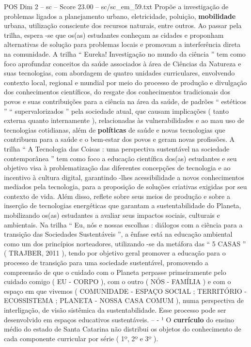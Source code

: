 \begin{textsample}{POS Dim 2 – sc – Score 23.00 – sc/sc\_em\_59.txt}
Propõe a investigação de problemas ligados a planejamento urbano, eletricidade, poluição, \textbf{mobilidade} urbana, utilização consciente dos recursos naturais, entre outros.
Ao passar pela trilha, espera -se que os(as) estudantes conheçam as cidades e proponham alternativas de solução para problemas locais e promovam a interferência direta na comunidade.
A trilha “ Eureka!
Investigação no mundo da ciência ” tem como foco aprofundar conceitos da saúde associados à área de Ciências da Natureza e suas tecnologias, com abordagem de quatro unidades curriculares, envolvendo contexto local, regional e mundial por meio do processo de produção e divulgação dos conhecimentos científicos, do resgate dos conhecimentos tradicionais dos povos e suas contribuições para a ciência na área da saúde, de padrões “ estéticos ” “ supervalorizados ” pela sociedade atual, que causam implicações ( tanto externa quanto internamente ), relacionadas às vulnerabilidades e ao mau uso de tecnologias cotidianas, além de \textbf{políticas} de saúde e novas tecnologias que contribuem para a saúde e o bem-estar dos povos e geram novas profissões.
A trilha “ A Tecnologia das Coisas : uma perspectiva sustentável na sociedade contemporânea ” tem como foco a educação científica dos(as) estudantes e seu objetivo visa à problematização das diferentes concepções de tecnologia e ao incentivo à cultura digital, garantindo -lhes acessibilidade a novos conhecimentos mediados pela tecnologia, para a proposição de soluções criativas exigidas por seu contexto de vida.
Além disso, reflete sobre seus meios de produção e sobre a inserção de tecnologias energéticas que garantam a sustentabilidade do Planeta, mobilizando os(as) estudantes a avaliar seus impactos sociais, culturais e ambientais.
Na trilha “ Eu, nós e nossas escolhas : diálogos com a ciência para a transição das Sociedades Sustentáveis ”, a ênfase está na educação ambiental como um dos princípios norteadores, utilizando -se da metáfora das “ 5 CASAS ” ( TRAJBER, 2011 ), tendo por objetivo geral promover a educação para o processo de transição para uma sociedade sustentável, promovendo a compreensão de que o cuidado com o Planeta perpasse primeiramente pelo cuidado comigo ( EU - CORPO ), com o outro ( NÓS - FAMÍLIA ) e com o espaço em que vivemos ( COMUNIDADE - ESPAÇO SOCIAL ; TERRITÓRIO - ECOSSISTEMA ; PLANETA - NOSSA CASA COMUM ), numa perspectiva de interligação, de visão sistêmica da sustentabilidade.
Esse processo pode ser desenvolvido em espaços educativos sustentáveis. -- - ¹ O \textbf{currículo} do ensino médio do estado de Santa Catarina não distribui os objetos do conhecimento de cada componente curricular por série ( 1º, 2º e 3º ).

\end{textsample}
